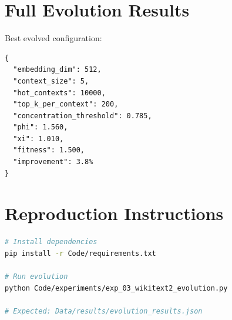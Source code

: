\documentclass[11pt,a4paper]{article}
\begin{document}
\appendix

\section{Full Evolution Results}

Best evolved configuration:
\begin{lstlisting}
{
  "embedding_dim": 512,
  "context_size": 5,
  "hot_contexts": 10000,
  "top_k_per_context": 200,
  "concentration_threshold": 0.785,
  "phi": 1.560,
  "xi": 1.010,
  "fitness": 1.500,
  "improvement": 3.8%
}
\end{lstlisting}

\section{Reproduction Instructions}

\begin{lstlisting}[language=bash]
# Install dependencies
pip install -r Code/requirements.txt

# Run evolution
python Code/experiments/exp_03_wikitext2_evolution.py

# Expected: Data/results/evolution_results.json
\end{lstlisting}
\end{document}
